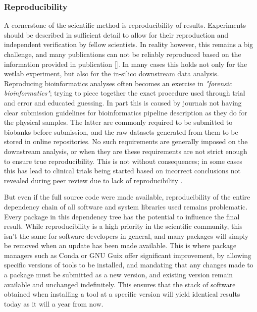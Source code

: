 \subsubsection{Reproducibility}

A cornerstone of the scientific method is reproducibility of results. Experiments should be described in sufficient detail to allow for their reproduction and independent verification by fellow scientists. In reality however, this remains a big challenge, and many publications can not be reliably reproduced based on the information provided in publication []. In many cases this holds not only for the wetlab experiment, but also for the in-silico downstream data analysis. Reproducing bioinformatics analyses often becomes an exercise in \textit{"forensic bioinformatics"}; trying to piece together the exact procedure used through trial and error and educated guessing. In part this is caused by journals not having clear submission guidelines for bioinformatics pipeline description as they do for the physical samples. The latter are commonly required to be submitted to biobanks before submission, and the raw datasets generated from them to be stored in online repositories. No such requirements are generally imposed on the downstream analysis, or when they are these requirements are not strict enough to ensure true reproducibility. This is not without consequences; in some cases this has lead to clinical trials being started based on incorrect conclusions not revealed during peer review due to lack of reproducibility \cite{baggerly2009reproducible}.

But even if the full source code were made available, reproducibility of the entire dependency chain of all software and system libraries used remains problematic. Every package in this dependency tree has the potential to influence the final result. While reproducibility is a high priority in the scientific community, this isn't the same for software developers in general, and many packages will simply be removed when an update has been made available. This is where package managers such as Conda \cite{gruning2017bioconda} or GNU Guix \cite{courtes2013functional} offer significant improvement, by allowing specific versions of tools to be installed, and mandating that any changes made to a package must be submitted as a new version, and existing version remain available and unchanged indefinitely. This ensures that the stack of software obtained when installing a tool at a specific version will yield identical results today as it will a year from now.

